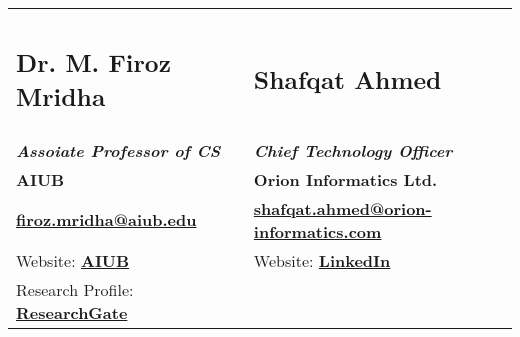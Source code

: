 \documentclass[]{deedy-resume-openfont}
\begin{document}
\begin{minipage}[t]{0.66\textwidth}
\begin{tabularx}{\textwidth}{p{}|p{}}
		\subsection{Dr. M. Firoz Mridha}                                                       & \subsection{Shafqat Ahmed}                                                                        \\
		\textit{\textbf{Assoiate Professor of CS}}                                             & \textit{\textbf{Chief Technology Officer}}                                                        \\
		\textbf{AIUB}                                                                          & \textbf{Orion Informatics Ltd.}                                                                   \\
		\href{mailto:firoz.mridha@aiub.edu}{\bf firoz.mridha@aiub.edu}                         & \href{mailto:shafqat.ahmed@orion-informatics.com}{\bf \mbox{shafqat.ahmed@orion-informatics.com}} \\
		Website: \href{https://cs.aiub.edu/profile/firoz.mridha}{\bf AIUB}                     & Website: \href{https://www.linkedin.com/in/shafqatahmed/}{\bf LinkedIn}                           \\
		Research Profile: \href{https://www.researchgate.net/profile/M-Ph-D}{\bf ResearchGate} &                                                                                                   \\
	\end{tabularx}





\end{minipage}%
\hfill
\end{document}
